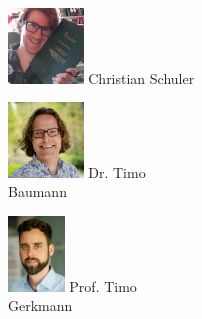 \documentclass[aspectratio=169]{beamer}
\begin{document}
\begin{frame}[fragile]
\begin{minipage}{.5\textwidth}
\begin{minipage}{.3\textwidth}
            \includegraphics[height=2cm]{images/Christian_Schuler_Thesis.jpg} 
            Christian Schuler
        \end{minipage}
        \begin{minipage}{.3\textwidth}
            \includegraphics[height=2cm]{images/Timo_Baumann.jpg}
            Dr. Timo\\Baumann
        \end{minipage}
        \begin{minipage}{.3\textwidth}
            \includegraphics[height=2cm]{images/Timo_Florian_Gerkmann.png}
            Prof. Timo\\Gerkmann
        \end{minipage}
    \end{minipage}
\end{frame}
\end{document}
